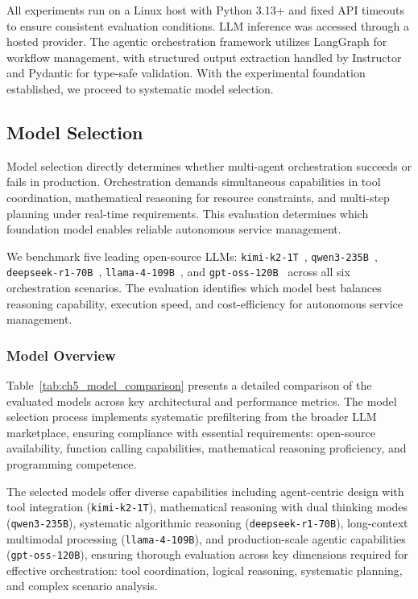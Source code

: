 {All experiments run on a Linux host with Python 3.13+ and fixed \ac{API} timeouts to ensure consistent evaluation conditions. \ac{LLM} inference was accessed through a hosted provider. The agentic orchestration framework utilizes \ac{LangGraph} for workflow management, with structured output extraction handled by Instructor and Pydantic for type-safe validation. With the experimental foundation established, we proceed to systematic model selection.

\subsection{Model Selection}
\label{subsec:ch5_model_selection}

Model selection directly determines whether multi-agent orchestration succeeds or fails in production. Orchestration demands simultaneous capabilities in tool coordination, mathematical reasoning for resource constraints, and multi-step planning under real-time requirements. This evaluation determines which foundation model enables reliable autonomous service management.

We benchmark five leading open-source \acp{LLM}: \texttt{kimi-k2-1T}~\cite{team2025kimi}, \texttt{qwen3-235B}~\cite{yang2025qwen3}, \texttt{deepseek-r1-70B}~\cite{guo2025deepseek}, \texttt{llama-4-109B}~\cite{singh2025llama4}, and \texttt{gpt-oss-120B}~\cite{agarwal2025gpt} across all six orchestration scenarios. The evaluation identifies which model best balances reasoning capability, execution speed, and cost-efficiency for autonomous service management.

\subsubsection{Model Overview}

Table~\ref{tab:ch5_model_comparison} presents a detailed comparison of the evaluated models across key architectural and performance metrics. The model selection process implements systematic prefiltering from the broader \ac{LLM} marketplace, ensuring compliance with essential requirements: open-source availability, function calling capabilities, mathematical reasoning proficiency, and programming competence.

The selected models offer diverse capabilities including agent-centric design with tool integration (\texttt{kimi-k2-1T}), mathematical reasoning with dual thinking modes (\texttt{qwen3-235B}), systematic algorithmic reasoning (\texttt{deepseek-r1-70B}), long-context multimodal processing (\texttt{llama-4-109B}), and production-scale agentic capabilities (\texttt{gpt-oss-120B}), ensuring thorough evaluation across key dimensions required for effective orchestration: tool coordination, logical reasoning, systematic planning, and complex scenario analysis.

}

